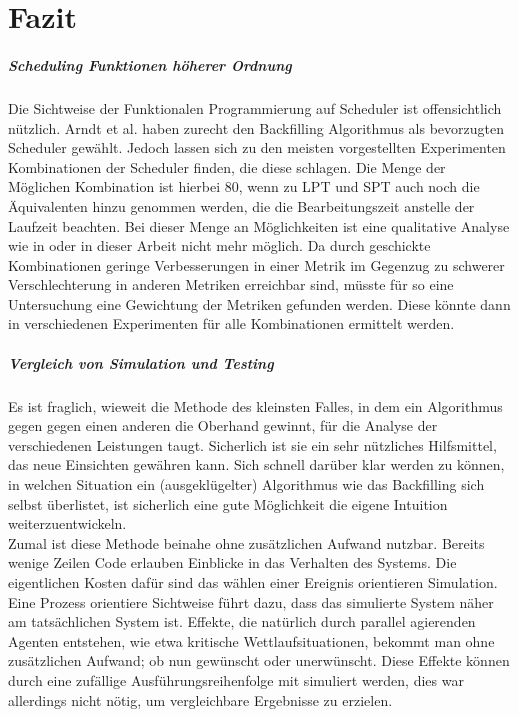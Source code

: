 \chapter{Fazit}

\paragraph{Scheduling Funktionen höherer Ordnung}
Die Sichtweise der Funktionalen Programmierung auf Scheduler ist offensichtlich nützlich. Arndt et al. \cite{Arn99} haben zurecht den Backfilling Algorithmus als bevorzugten Scheduler gewählt. Jedoch lassen sich zu den meisten vorgestellten Experimenten Kombinationen der Scheduler finden, die diese schlagen. Die Menge der Möglichen Kombination ist hierbei 80, wenn zu LPT und SPT auch noch die Äquivalenten hinzu genommen werden, die die Bearbeitungszeit anstelle der Laufzeit beachten. Bei dieser Menge an Möglichkeiten ist eine qualitative Analyse wie in \cite{Arn99} oder in dieser Arbeit nicht mehr möglich. Da durch geschickte Kombinationen geringe Verbesserungen in einer Metrik im Gegenzug zu schwerer Verschlechterung in anderen Metriken erreichbar sind, müsste für so eine Untersuchung eine Gewichtung der Metriken gefunden werden. Diese könnte dann in verschiedenen Experimenten für alle Kombinationen ermittelt werden.


\paragraph{Vergleich von Simulation und Testing}
Es ist fraglich, wieweit die Methode des kleinsten Falles, in dem ein Algorithmus gegen gegen einen anderen die Oberhand gewinnt, für die Analyse der verschiedenen Leistungen taugt. Sicherlich ist sie ein sehr nützliches Hilfsmittel, das neue Einsichten gewähren kann. Sich schnell darüber klar werden zu können, in welchen Situation ein (ausgeklügelter) Algorithmus wie das Backfilling sich selbst überlistet, ist sicherlich eine gute Möglichkeit die eigene Intuition weiterzuentwickeln.\\
Zumal ist diese Methode beinahe ohne zusätzlichen Aufwand nutzbar. Bereits wenige Zeilen Code erlauben Einblicke in das Verhalten des Systems. Die eigentlichen Kosten dafür sind das wählen einer Ereignis orientieren Simulation. Eine Prozess orientiere Sichtweise führt dazu, dass das simulierte System näher am tatsächlichen System ist. Effekte, die natürlich durch parallel agierenden Agenten entstehen, wie etwa kritische Wettlaufsituationen, bekommt man ohne zusätzlichen Aufwand; ob nun gewünscht oder unerwünscht. Diese Effekte können durch eine zufällige Ausführungsreihenfolge mit simuliert werden, dies war allerdings nicht nötig, um vergleichbare Ergebnisse zu erzielen.

